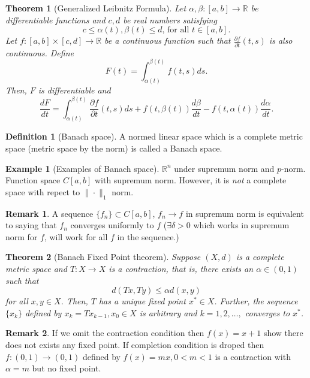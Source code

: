\documentclass[12pt,reqno]{amsart}
\theoremstyle{plain}
\newtheorem{thm}{Theorem}
\theoremstyle{definition}
\newtheorem{defn}{Definition}
\newtheorem{eg}{Example}
\newtheorem{rem}{Remark}
\begin{document}
\begin{thm}[Generalized Leibnitz Formula]
    Let $\alpha, \beta \colon [a,b] \to \mathbb{R}$ be differentiable functions and $c,d$ be real numbers satisfying 
    $$ c \leq \alpha(t), \beta(t) \leq d\text{, for all }t \in [a,b].$$
    Let $f \colon[a,b] \times [c,d] \to \mathbb{R}$ be a continuous function such that $\frac{\partial f}{\partial t}(t,s)$ is also continuous. Define
    $$F(t) = \int_{\alpha(t)}^{\beta(t)} f(t,s) ds.$$
    Then, $F$ is differentiable and
    $$ \frac{dF}{dt} = \int_{\alpha(t)}^{\beta(t)} \frac{\partial f}{\partial t}(t,s) ds + f(t, \beta(t))\frac{d\beta}{dt} - f(t, \alpha(t)) \frac{d\alpha}{dt}.$$
\end{thm}
\begin{defn}[Banach space]
    A normed linear space which is a complete metric space (metric space by the norm) is called a Banach space. 
\end{defn}
\begin{eg}[Examples of Banach space]
    $\mathbb{R}^n$ under supremum norm and $p$-norm. Function space $C[a,b]$ with supremum norm. However, it is {\it not} a complete space with repect to $\|\cdot\|_1$ norm.
\end{eg}
\begin{rem}
    A sequence $\{f_n\} \subset C[a,b]$, $f_n \to f$ in supremum norm is equivalent to saying that $f_n$ converges uniformly to $f$ ($\exists \delta > 0$ which works in supremum norm for $f$, will work for all $f$ in the sequence.)
\end{rem}
\begin{thm}[Banach Fixed Point theorem]
    Suppose $(X,d)$ is a complete metric space and $T \colon X \to X$ is a contraction, that is, there exists an $\alpha \in (0,1)$ such that
    $$ d(Tx, Ty) \leq \alpha d(x,y)$$
    for all $x,y \in X$. Then, $T$ has a unique fixed point $x^* \in X$. Further, the sequence $\{x_k\}$ defined by $x_k = Tx_{k-1}, x_0 \in X$ is arbitrary and $k = 1,2,\dots,$ converges to $x^*$.
\end{thm}
\begin{rem}
    If we omit the contraction condition then $f(x) = x + 1$ show there does not exists any fixed point. If completion condition is droped then $f \colon (0,1) \to (0,1)$ defined by $f(x) = mx, 0 < m < 1$ is a contraction with $\alpha = m$ but no fixed point.
\end{rem}
\end{document}
